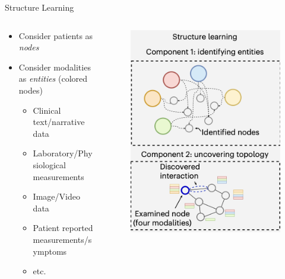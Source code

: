 \documentclass{beamer}
\begin{document}
\begin{frame}{Structure Learning}
    \begin{columns}[T]
    \begin{column}{0.5\textwidth}
        \vspace{12mm}
        \begin{itemize}
            \item Consider patients as {\it nodes} 
            \item Consider modalities as {\it entities} (colored nodes)
            \begin{itemize}
                \item Clinical text/narrative data 
                \item Laboratory/Physiological measurements 
                \item Image/Video data 
                \item Patient reported measurements/symptoms
                \item etc. 
            \end{itemize}
        \end{itemize}      
    \end{column}
    \begin{column}{0.5\textwidth}
        \begin{figure}
            \includegraphics[scale=0.4]{Ektefaie_StructureLearning.png}

\end{figure}
\end{column}
\end{columns}
\end{frame}
\end{document}
